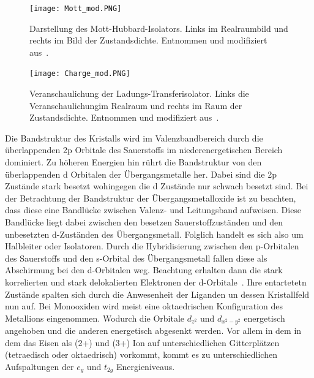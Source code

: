         \begin{figure}
            \centering
            \texttt{[image: Mott\_mod.PNG]}
            \caption{Darstellung des Mott-Hubbard-Isolators. Links im Realraumbild und rechts im Bild der Zustandsdichte.
            Entnommen und modifiziert aus~\cite{stohr_magnetism_2006}.}
            \label{fig:Mott}
        \end{figure}
        \begin{figure}
            \centering
            \texttt{[image: Charge\_mod.PNG]}
            \caption{Veranschaulichung der Ladungs-Transferisolator. Links die Veranschaulichungim Realraum und rechts im Raum der Zustandsdichte.
            Entnommen und modifiziert aus~\cite{stohr_magnetism_2006}.}
            \label{fig:Charge}
        \end{figure}
        Die Bandstruktur des Kristalls wird im Valenzbandbereich durch die überlappenden 2p Orbitale des Sauerstoffs im niederenergetischen Bereich dominiert.
        Zu höheren Energien hin rührt die Bandstruktur von den überlappenden d Orbitalen der Übergangsmetalle her.
        Dabei sind die 2p Zustände stark besetzt wohingegen die d Zustände nur schwach besetzt sind.
        Bei der Betrachtung der Bandstruktur der Übergangsmetalloxide ist zu beachten, dass diese eine Bandlücke zwischen Valenz- und Leitungsband aufweisen.
        Diese Bandlücke liegt dabei zwischen den besetzen Sauerstoffzuständen und den unbesetzten d-Zuständen des Übergangsmetall.
        Folglich handelt es sich also um Halbleiter oder Isolatoren.
        Durch die Hybridisierung zwischen den p-Orbitalen des Sauerstoffs und den s-Orbital des Übergangsmetall fallen diese als Abschirmung bei den d-Orbitalen weg.
        Beachtung erhalten dann die stark korrelierten und stark delokalierten Elektronen der d-Orbitale~\cite{dane_beschreibung_2008}.
        Ihre entartetetn Zustände spalten sich durch die Anwesenheit der Liganden un dessen Kristallfeld nun auf.
        Bei Monooxiden wird meist eine oktaedrischen Konfiguration des Metallions eingenommen.
        Wodurch die Orbitale $d_{z^2}$ und $d_{x^2-y^2}$ energetisch angehoben und die anderen energetisch abgesenkt werden.
        Vor allem in dem  in dem das Eisen als (2+) und (3+) Ion auf unterschiedlichen Gitterplätzen (tetraedisch oder oktaedrisch) vorkommt, kommt es zu unterschiedlichen Aufspaltungen der $e_g$ und $t_{2g}$ Energieniveaus.
        
